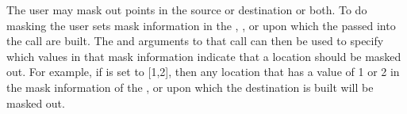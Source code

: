 \documentclass[letterpaper,10pt,english]{sphinxmanual}
\begin{document}
The user may mask out points in the source {\hyperref[\detokenize{field:ESMF.api.field.Field}]{}} or destination {\hyperref[\detokenize{field:ESMF.api.field.Field}]{}} or both. To do masking the user
sets mask information in the {\hyperref[\detokenize{grid:ESMF.api.grid.Grid}]{}}, {\hyperref[\detokenize{mesh:ESMF.api.mesh.Mesh}]{}}, or {\hyperref[\detokenize{locstream:ESMF.api.locstream.LocStream}]{}} upon
which the {\hyperref[\detokenize{field:ESMF.api.field.Field}]{}} passed into the {\hyperref[\detokenize{regrid:ESMF.api.regrid.Regrid}]{}} call are built. The  and
 arguments to that call can then be used to specify which values in that mask information
indicate that a location should be masked out. For example, if  is set to {[}1,2{]}, then any
location that has a value of 1 or 2 in the mask information of the {\hyperref[\detokenize{grid:ESMF.api.grid.Grid}]{}}, {\hyperref[\detokenize{mesh:ESMF.api.mesh.Mesh}]{}} or {\hyperref[\detokenize{locstream:ESMF.api.locstream.LocStream}]{}} upon which
the destination {\hyperref[\detokenize{field:ESMF.api.field.Field}]{}} is built will be masked out.
\end{document}

